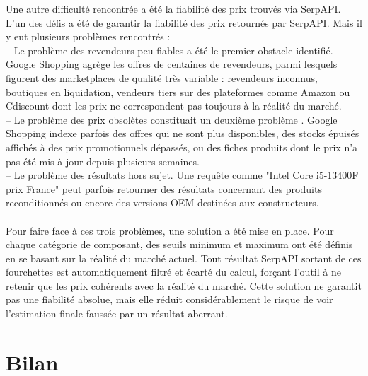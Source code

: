 \documentclass[a4paper, 12pt, twoside]{article}
\begin{document}
Une autre difficulté rencontrée a été la fiabilité des prix trouvés via SerpAPI.\\
L'un des défis a été de garantir la fiabilité des prix retournés par SerpAPI. Mais il y eut plusieurs problèmes rencontrés :\\
– Le problème des revendeurs peu fiables a été le premier obstacle identifié. Google Shopping agrège les offres de centaines de revendeurs, parmi lesquels figurent des marketplaces de qualité très variable : revendeurs inconnus, boutiques en liquidation, vendeurs tiers sur des plateformes comme Amazon ou Cdiscount dont les prix ne correspondent pas toujours à la réalité du marché.\\
– Le problème des prix obsolètes constituait un deuxième problème . Google Shopping indexe parfois des offres qui ne sont plus disponibles, des stocks épuisés affichés à des prix promotionnels dépassés, ou des fiches produits dont le prix n'a pas été mis à jour depuis plusieurs semaines.\\
– Le problème des résultats hors sujet. Une requête comme "Intel Core i5-13400F prix France" peut parfois retourner des résultats concernant des produits reconditionnés ou encore des versions OEM destinées aux constructeurs. \\
\\
Pour faire face à ces trois problèmes, une solution a été mise en place. Pour chaque catégorie de composant, des seuils minimum et maximum ont été définis en se basant sur la réalité du marché actuel. Tout résultat SerpAPI sortant de ces fourchettes est automatiquement filtré et écarté du calcul, forçant l'outil à ne retenir que les prix cohérents avec la réalité du marché. Cette solution ne garantit pas une fiabilité absolue, mais elle réduit considérablement le risque de voir l'estimation finale faussée par un résultat aberrant.

\newpage


\section{Bilan}
\end{document}

